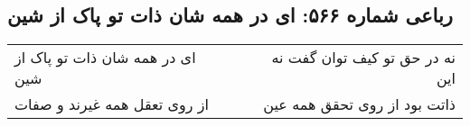 \begin{center}
\section*{رباعی شماره ۵۶۶: ای در همه شان ذات تو پاک از شین}
\label{sec:sh566}
\begin{longtable}{l p{0.5cm} r}
ای در همه شان ذات تو پاک از شین
&&
نه در حق تو کیف توان گفت نه این
\\
از روی تعقل همه غیرند و صفات
&&
ذاتت بود از روی تحقق همه عین
\\
\end{longtable}
\end{center}
